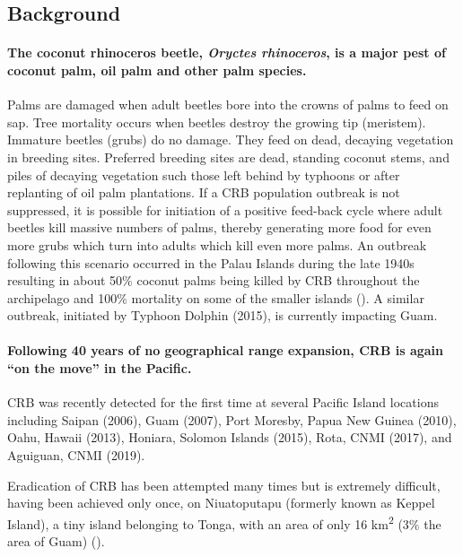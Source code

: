 \documentclass[12pt,letterpaper,english,bibliography=totocnumbered, abstract=on]{scrartcl}
\begin{document}
\subsection{Background}

\paragraph{The coconut rhinoceros beetle, \emph{Oryctes rhinoceros}, is a major
pest of coconut palm, oil palm and other palm species.}

Palms are damaged when adult beetles bore into the crowns of palms
to feed on sap. Tree mortality occurs when beetles destroy the growing
tip (meristem). Immature beetles (grubs) do no damage. They feed on
dead, decaying vegetation in breeding sites. Preferred breeding sites
are dead, standing coconut stems, and piles of decaying vegetation
such those left behind by typhoons or after replanting of oil palm
plantations. If a CRB population outbreak is not suppressed, it is possible
for initiation of a positive feed-back cycle where adult beetles kill
massive numbers of palms, thereby generating more food for even more
grubs which turn into adults which kill even more palms. An outbreak
following this scenario occurred in the Palau Islands during the late
1940s resulting in about 50\% coconut palms being killed by CRB throughout
the archipelago and 100\% mortality on some of the smaller islands
(\cite{gressitt_coconut_1953}). A similar outbreak, initiated by Typhoon Dolphin (2015), is currently impacting Guam.

\paragraph{Following 40 years of no geographical range expansion, CRB is again
``on the move'' in the Pacific.}

CRB was recently detected for the first time at several Pacific Island
locations including Saipan (2006), Guam (2007), Port Moresby, Papua
New Guinea (2010), Oahu, Hawaii (2013), Honiara, Solomon Islands
(2015), Rota, CNMI (2017), and Aguiguan, CNMI (2019). 

Eradication of CRB has been attempted many times but is extremely
difficult, having been achieved only once, on Niuatoputapu (formerly
known as Keppel Island), a tiny island belonging to Tonga, with an
area of only 16 km\textsuperscript{2} (3\% the area of Guam) (\cite{catley_coconut_1969}).
\end{document}
